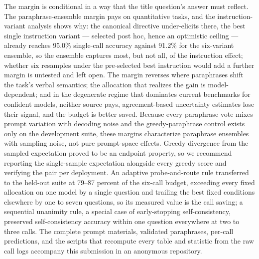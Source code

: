 The margin is conditional in a way that the title question's answer must reflect. The paraphrase-ensemble margin pays on quantitative tasks, and the instruction-variant analysis shows why: the canonical directive under-elicits there, the best single instruction variant --- selected post hoc, hence an optimistic ceiling --- already reaches 95.0\% single-call accuracy against 91.2\% for the six-variant ensemble, so the ensemble captures most, but not all, of the instruction effect; whether six resamples under the pre-selected best instruction would add a further margin is untested and left open. The margin reverses where paraphrases shift the task's verbal semantics; the allocation that realizes the gain is model-dependent; and in the degenerate regime that dominates current benchmarks for confident models, neither source pays, agreement-based uncertainty estimates lose their signal, and the budget is better saved. Because every paraphrase vote mixes prompt variation with decoding noise and the greedy-paraphrase control exists only on the development suite, these margins characterize paraphrase ensembles with sampling noise, not pure prompt-space effects. Greedy divergence from the sampled expectation proved to be an endpoint property, so we recommend reporting the single-sample expectation alongside every greedy score and verifying the pair per deployment. An adaptive probe-and-route rule transferred to the held-out suite at 79--87 percent of the six-call budget, exceeding every fixed allocation on one model by a single question and trailing the best fixed conditions elsewhere by one to seven questions, so its measured value is the call saving; a sequential unanimity rule, a special case of early-stopping self-consistency, preserved self-consistency accuracy within one question everywhere at two to three calls. The complete prompt materials, validated paraphrases, per-call predictions, and the scripts that recompute every table and statistic from the raw call logs accompany this submission in an anonymous repository.
